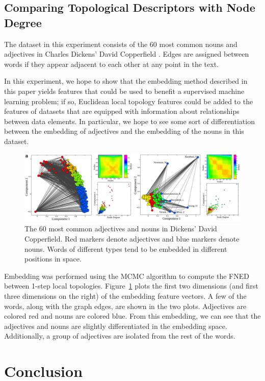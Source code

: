 \documentclass{article}
\begin{document}
\subsection{Comparing Topological Descriptors with Node Degree}
The dataset in this experiment consists of the 60 most common nouns and adjectives in Charles Dickens' David Copperfield \cite{newman2006finding}. Edges are assigned between words if they appear adjacent to each other at any point in the text.

In this experiment, we hope to show that the embedding method described in this paper yields features that could be used to benefit a supervised machine learning problem; if so, Euclidean local topology features could be added to the features of datasets that are equipped with information about relationships between data elements. In particular, we hope to see some sort of differentiation between the embedding of adjectives and the embedding of the nouns in this dataset.

\begin{figure}[h!tbp]
  \centering               
  \includegraphics[width=1\textwidth]{fig/fig5.pdf}
  \caption{The 60 most common adjectives and nouns in Dickens' David Copperfield. Red markers denote adjectives and blue markers denote nouns. Words of different types tend to be embedded in different positions in space.}
  \label{fig:dickensCopperfield}
\end{figure}

Embedding was performed using the MCMC algorithm to compute the FNED between 1-step local topologies. Figure~\ref{fig:dickensCopperfield} plots the first two dimensions (and first three dimensions on the right) of the embedding feature vectors. A few of the words, along with the graph edges, are shown in the two plots. Adjectives are colored red and nouns are colored blue. From this embedding, we can see that the adjectives and nouns are slightly differentiated in the embedding space. Additionally, a group of adjectives are isolated from the rest of the words.


\section{Conclusion}
\label{sec:conclusion}
\end{document}
